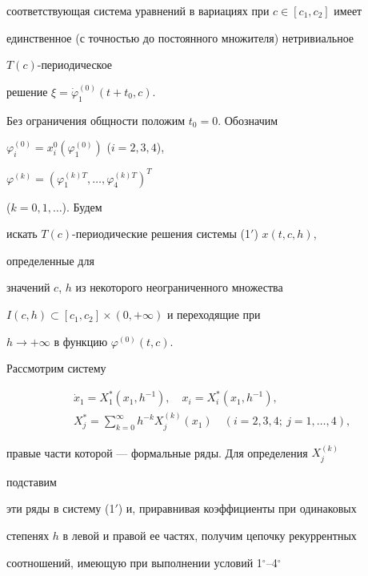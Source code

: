 соответствующая система уравнений в вариациях при $c\in[c_1,c_2]$ имеет 


единственное (с точностью до постоянного множителя) нетривиальное 


$T(c)$-периодическое 


решение $\xi=\Dot\varphi^{(0)}_1(t+t_0,c)$. 


\medskip 


 


Без ограничения общности положим $t_0=0$. Обозначим 


$\varphi^{(0)}_i=x^0_i(\varphi^{(0)}_1)$ ($i=2,3,4$), 


$\varphi^{(k)}=(\varphi^{(k)T}_1,\dotsc,\varphi^{(k)T}_4)^T$ 


($k=0,1,\dotsc$). Будем 


искать $T(c)$-периодические решения системы (1${}'$) $x(t,c,h)$, 


определенные для 


значений $c$, $h$ из некоторого неограниченного множества 


$I(c,h)\subset[c_1,c_2]\times(0,+\infty)$ и переходящие при 


$h\to+\infty$ в функцию $\varphi^{(0)}(t,c)$. 


 


Рассмотрим систему 


\begin{equation} 


\begin{split} 


& \Dot x_1=X^*_1(x_1,h^{-1}),\quad x_i=X^*_i(x_1,h^{-1}), \\ 


& X^*_j=\sum^\infty_{k=0}h^{-k}X^{(k)}_j(x_1)\quad 


(i=2,3,4; \ j=1,\dotsc,4), 


\end{split} 


\end{equation} 


правые части которой --- формальные ряды. Для определения $X^{(k)}_j$ 


подставим 


эти ряды в систему (1${}'$) и, приравнивая коэффициенты при одинаковых 


степенях $h$ в левой и правой ее частях, получим цепочку рекуррентных 


соотношений, имеющую при выполнении условий 1${}^\circ$--4${}^\circ$ 


